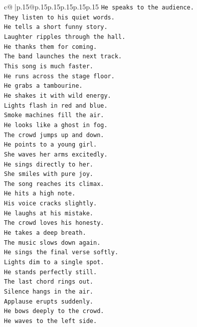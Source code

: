 \documentclass{article}
\begin{document}
{\begin{supertabular}{c@{$\;$}|p{.15\linewidth}@{}p{.15\linewidth}p{.15\linewidth}p{.15\linewidth}p{.15\linewidth}p{.15\linewidth}}
{{{\texttt{He speaks to the audience.} \\
\texttt{They listen to his quiet words.} \\
\texttt{He tells a short funny story.} \\
\texttt{Laughter ripples through the hall.} \\
\texttt{He thanks them for coming.} \\
\texttt{The band launches the next track.} \\
\texttt{This song is much faster.} \\
\texttt{He runs across the stage floor.} \\
\texttt{He grabs a tambourine.} \\
\texttt{He shakes it with wild energy.} \\
\texttt{Lights flash in red and blue.} \\
\texttt{Smoke machines fill the air.} \\
\texttt{He looks like a ghost in fog.} \\
\texttt{The crowd jumps up and down.} \\
\texttt{He points to a young girl.} \\
\texttt{She waves her arms excitedly.} \\
\texttt{He sings directly to her.} \\
\texttt{She smiles with pure joy.} \\
\texttt{The song reaches its climax.} \\
\texttt{He hits a high note.} \\
\texttt{His voice cracks slightly.} \\
\texttt{He laughs at his mistake.} \\
\texttt{The crowd loves his honesty.} \\
\texttt{He takes a deep breath.} \\
\texttt{The music slows down again.} \\
\texttt{He sings the final verse softly.} \\
\texttt{Lights dim to a single spot.} \\
\texttt{He stands perfectly still.} \\
\texttt{The last chord rings out.} \\
\texttt{Silence hangs in the air.} \\
\texttt{Applause erupts suddenly.} \\
\texttt{He bows deeply to the crowd.} \\
\texttt{He waves to the left side.} \\
}}}
\end{supertabular}}
\end{document}
